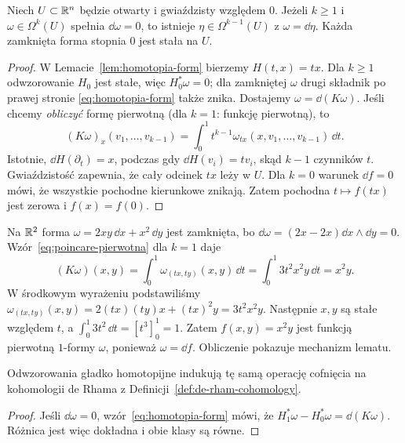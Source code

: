 \begin{twierdzenie}
\label{thm:lemat-poincare-formy}
Niech $U\subset\mathbb{R}^n$ będzie otwarty i gwiaździsty
względem $0$. Jeżeli $k\geq1$ i
$\omega\in\Omega^k(U)$ spełnia $\dd\omega=0$,
to istnieje $\eta\in\Omega^{k-1}(U)$ z
$\omega=\dd\eta$. Każda zamknięta forma stopnia
$0$ jest stała na $U$.
\end{twierdzenie}
\begin{proof}
W Lemacie~\ref{lem:homotopia-form} bierzemy
$H(t,x)=tx$. Dla $k\geq1$ odwzorowanie $H_0$
jest stałe, więc $H_0^*\omega=0$; dla zamkniętej
$\omega$ drugi składnik po prawej stronie
\eqref{eq:homotopia-form} także znika.
Dostajemy $\omega=\dd(K\omega)$.
Jeśli chcemy \emph{obliczyć} formę pierwotną
(dla $k=1$: funkcję pierwotną), to
\begin{equation}\label{eq:poincare-pierwotna}
 (K\omega)_x(v_1,\ldots,v_{k-1})
 =\int_0^1 t^{k-1}
   \omega_{tx}(x,v_1,\ldots,v_{k-1})\,\dd t.
\end{equation}
Istotnie, $\dd H(\partial_t)=x$, podczas gdy
$\dd H(v_i)=tv_i$, skąd $k-1$ czynników $t$.
Gwiaździstość zapewnia, że cały odcinek $tx$ leży w $U$.
Dla $k=0$ warunek $\dd f=0$ mówi, że wszystkie
pochodne kierunkowe znikają. Zatem pochodna
$t\mapsto f(tx)$ jest zerowa i $f(x)=f(0)$.
\end{proof}

\begin{przyklad}
Na $\mathbb{R}^2$ forma $\omega=2xy\,\dd x+x^2\,\dd y$
jest zamknięta, bo
$\dd\omega=(2x-2x)\dd x\wedge\dd y=0$.
Wzór~\eqref{eq:poincare-pierwotna} dla $k=1$ daje
\[
 (K\omega)(x,y)=\int_0^1
 \omega_{(tx,ty)}(x,y)\,\dd t
 =\int_0^1 3t^2x^2y\,\dd t=x^2y.
\]
W środkowym wyrażeniu podstawiliśmy
$\omega_{(tx,ty)}(x,y)=2(tx)(ty)x+(tx)^2y=3t^2x^2y$.
Następnie $x,y$ są stałe względem $t$, a
$\int_0^1 3t^2\,\dd t=[t^3]_0^1=1$.
Zatem $f(x,y)=x^2y$ jest funkcją pierwotną
$1$-formy $\omega$, ponieważ $\omega=\dd f$.
Obliczenie pokazuje mechanizm lematu.
\end{przyklad}

\begin{wniosek}
\label{cor:de-rham-homotopia}
Odwzorowania gładko homotopijne indukują tę samą
operację cofnięcia na kohomologii de Rhama
z Definicji~\ref{def:de-rham-cohomology}.
\end{wniosek}
\begin{proof}
Jeśli $\dd\omega=0$, wzór~\eqref{eq:homotopia-form}
mówi, że $H_1^*\omega-H_0^*\omega=\dd(K\omega)$.
Różnica jest więc dokładna i obie klasy są równe.
\end{proof}

